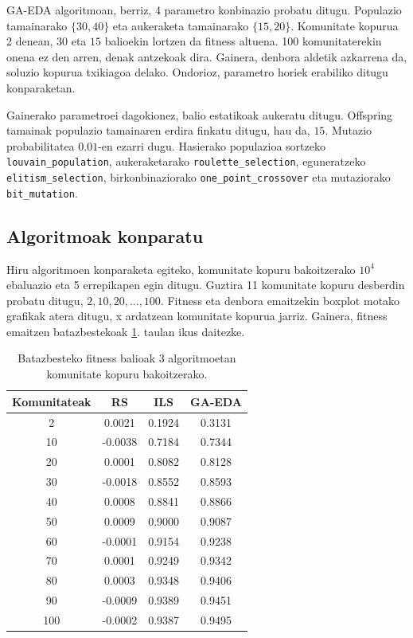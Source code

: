 \documentclass[sigconf]{acmart}
\begin{document}
GA-EDA algoritmoan, berriz, 4 parametro konbinazio probatu ditugu. Populazio tamainarako $\{30, 40\}$ eta aukeraketa tamainarako $\{15, 20\}$. Komunitate kopurua 2 denean, $30$ eta $15$ balioekin lortzen da fitness altuena. 100 komunitaterekin onena ez den arren, denak antzekoak dira. Gainera, denbora aldetik azkarrena da, soluzio kopurua txikiagoa delako. Ondorioz, parametro horiek erabiliko ditugu konparaketan.

Gainerako parametroei dagokionez, balio estatikoak aukeratu ditugu. Offspring tamainak populazio tamainaren erdira finkatu ditugu, hau da, $15$. Mutazio probabilitatea $0.01$-en ezarri dugu. Hasierako populazioa sortzeko \texttt{louvain\_population}, aukeraketarako \texttt{roulette\_selection}, eguneratzeko \texttt{elitism\_selection}, birkonbinaziorako \texttt{one\_point\_crossover} eta mutaziorako \texttt{bit\_mutation}.

\subsection{Algoritmoak konparatu}
Hiru algoritmoen konparaketa egiteko, komunitate kopuru bakoitzerako $10^4$ ebaluazio eta 5 errepikapen egin ditugu. Guztira 11 komunitate kopuru desberdin probatu ditugu, $2, 10, 20, ..., 100$. Fitness eta denbora emaitzekin boxplot motako grafikak atera ditugu, x ardatzean komunitate kopurua jarriz. Gainera, fitness emaitzen batazbestekoak \ref{tab:results}. taulan ikus daitezke.

\begin{table}[ht]
\centering
\begin{tabular}{|c|c|c|c|} 
    \hline
    Komunitateak & RS & ILS & GA-EDA \\
    \hline
    2 & 0.0021 & 0.1924 & 0.3131 \\
    10 & -0.0038 & 0.7184 & 0.7344 \\
    20 & 0.0001 & 0.8082 & 0.8128 \\
    30 & -0.0018 & 0.8552 & 0.8593 \\
    40 & 0.0008 & 0.8841 & 0.8866 \\
    50 & 0.0009 & 0.9000 & 0.9087 \\
    60 & -0.0001 & 0.9154 & 0.9238 \\
    70 & 0.0001 & 0.9249 & 0.9342 \\
    80 & 0.0003 & 0.9348 & 0.9406 \\
    90 & -0.0009 & 0.9389 & 0.9451 \\
    100 & -0.0002 & 0.9387 & 0.9495 \\
    \hline
\end{tabular}
\caption{Batazbesteko fitness balioak 3 algoritmoetan komunitate kopuru bakoitzerako.}
\label{tab:results}
\end{table}
\end{document}
